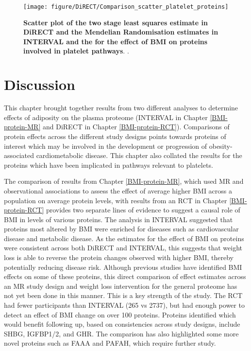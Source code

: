 \documentclass[11pt,twoside]{bristolthesis}
\begin{document}
\begin{figure}

{\centering \texttt{[image: figure/DiRECT/Comparison\_scatter\_platelet\_proteins]} 

}

\caption[Scatter plot of the two stage least squares estimate in DiRECT and the Mendelian Randomisation estimates in INTERVAL and the for the effect of BMI on proteins involved in platelet pathways]{\textbf{Scatter plot of the two stage least squares estimate in DiRECT and the Mendelian Randomisation estimates in INTERVAL and the for the effect of BMI on proteins involved in platelet pathways}. .}\label{fig:DiRECT-INTERVAL-platelet}
\end{figure}
\hypertarget{discussion-5}{%
\section{Discussion}\label{discussion-5}}

This chapter brought together results from two different analyses to determine effects of adiposity on the plasma proteome (INTERVAL in Chapter \ref{BMI-protein-MR} and DiRECT in Chapter \ref{BMI-protein-RCT}). Comparisons of protein effects across the different study designs points towards proteins of interest which may be involved in the development or progression of obesity-associated cardiometabolic disease. This chapter also collated the results for the proteins which have been implicated in pathways relevant to platelets.

The comparison of results from Chapter \ref{BMI-protein-MR}, which used MR and observational associations to assess the effect of average higher BMI across a population on average protein levels, with results from an RCT in Chapter \ref{BMI-protein-RCT} provides two separate lines of evidence to suggest a causal role of BMI in levels of various proteins. The analysis in INTERVAL suggested that proteins most altered by BMI were enriched for diseases such as cardiovascular disease and metabolic disease. As the estimates for the effect of BMI on proteins were consistent across both DiRECT and INTERVAL, this suggests that weight loss is able to reverse the protein changes observed with higher BMI, thereby potentially reducing disease risk. Although previous studies have identified BMI effects on some of these proteins, this direct comparison of effect estimates across an MR study design and weight loss intervention for the general proteome has not yet been done in this manner. This is a key strength of the study. The RCT had fewer participants than INTERVAL (265 vs 2737), but had enough power to detect an effect of BMI change on over 100 proteins. Proteins identified which would benefit following up, based on consistencies across study designs, include SHBG, IGFBP1/2, and GHR. The comparison has also highlighted some more novel proteins such as FAAA and PAFAH, which require further study.
\end{document}
